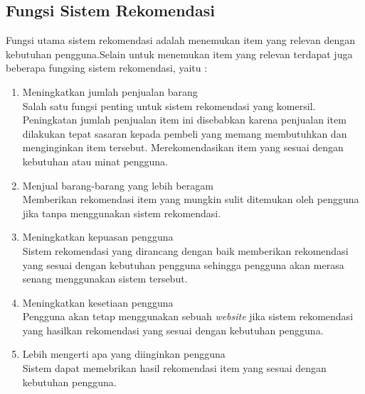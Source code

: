 \subsection{Fungsi Sistem Rekomendasi}
Fungsi utama sistem rekomendasi adalah menemukan item yang relevan dengan kebutuhan pengguna.Selain untuk menemukan item yang relevan terdapat juga beberapa fungsing sistem rekomendasi, yaitu  : %
	\begin{enumerate}
		\item Meningkatkan jumlah penjualan barang\\
			Salah satu fungsi penting untuk sistem rekomendasi yang komersil. Peningkatan jumlah penjualan item ini disebabkan karena penjualan item dilakukan tepat sasaran kepada pembeli yang memang membutuhkan dan menginginkan item tersebut. Merekomendasikan item yang sesuai dengan kebutuhan atau minat pengguna.
			
		\item Menjual barang-barang yang lebih beragam\\
			Memberikan rekomendasi item yang mungkin sulit ditemukan oleh pengguna jika tanpa menggunakan sistem rekomendasi.
			
		\item Meningkatkan kepuasan pengguna\\
			Sistem rekomendasi yang dirancang dengan baik memberikan rekomendasi yang sesuai dengan kebutuhan pengguna sehingga pengguna akan merasa senang menggunakan sistem tersebut.
		
		\item Meningkatkan kesetiaan pengguna\\
			Pengguna akan tetap menggunakan sebuah \textit{website} jika sistem rekomendasi yang hasilkan rekomendasi yang sesuai dengan kebutuhan pengguna. 
			
		\item Lebih mengerti apa yang diinginkan pengguna\\
			Sistem dapat memebrikan hasil rekomendasi item yang sesuai dengan kebutuhan pengguna.
	\end{enumerate} \leavevmode

